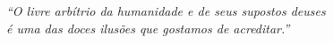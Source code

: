 \begin{epigrafe}
	\vspace*{\fill}
	\begin{flushright}
		\textit{``O livre arbítrio da humanidade e de seus supostos deuses \\é uma das doces ilusões que gostamos de acreditar.''}
	\end{flushright}
\end{epigrafe}